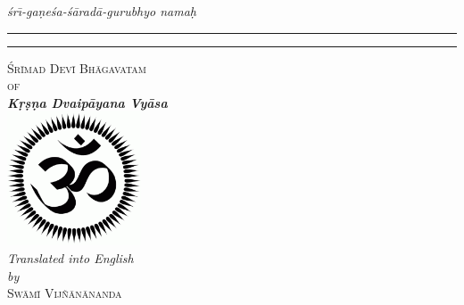 \thispagestyle{empty}
\begin{center}
{\itshape \'sr\={\i}-ga\d{n}e\'sa-\'s\=arad\=a-gurubhyo nama\d{h}}\\[.5cm]
\hrule\vspace*{.1cm}\hrule\vspace*{2cm}

{\Huge\scshape \'Sr\={\i}mad Dev\={\i} Bh\=agavatam}\\[.5cm]
{\large\scshape of}\\[.5cm]
{\Large\bfseries\itshape K\d{r}\d{s}\d{n}a Dvaip\=ayana Vy\=asa}\\[3cm]
\includegraphics[width=150px, height=150px]{om.png}\\[3cm]
{\large\itshape Translated into English\\[0.25cm]by}\\[.5cm]
{\Large\scshape Sw\=am\={\i} Vij\~n\=an\=ananda}\\[1cm]
\end{center}

    \newpage
    \thispagestyle{empty}
    \mbox{}
    